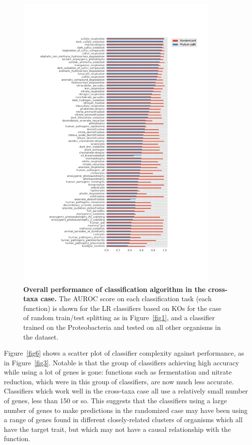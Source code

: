 \documentclass[10pt,letterpaper]{article}
\begin{document}
\begin{figure}[!h]
\includegraphics[width=0.9\textwidth]{fig5b}
\caption{{\bf Overall performance of classification algorithm in the cross-taxa case.}
The AUROC score on each classification task (each function) is shown for the LR classifiers based on KOs for the case of random train/test splitting as in Figure~\ref{fig1}, and a classifier trained on the Proteobacteria and tested on all other organisms in the dataset.}
\label{fig5}
\end{figure}

Figure~\ref{fig6} shows a scatter plot of classifier complexity against performance, as in Figure~\ref{fig3}. Notable is that the group of classifiers achieving high accuracy while using a lot of genes is gone: functions such as fermentation and nitrate reduction, which were in this group of classifiers, are now much less accurate. Classifiers which work well in the cross-taxa case all use a relatively small number of genes, less than 150 or so. This suggests that the classifiers using a large number of genes to make predictions in the randomized case may have been using a range of genes found in different closely-related clusters of organisms which all have the target trait, but which may not have a causal relationship with the function.
\end{document}
